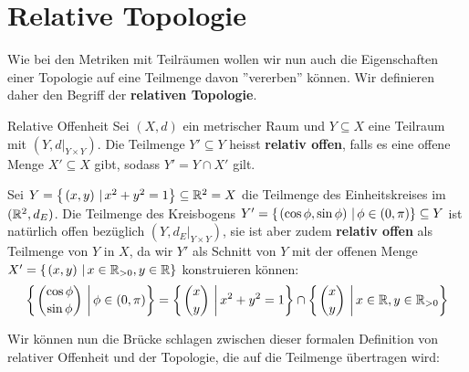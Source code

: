\section{Relative Topologie}
Wie bei den Metriken mit Teilräumen wollen wir nun auch die Eigenschaften einer Topologie auf eine Teilmenge davon ''vererben'' können. Wir definieren daher den Begriff der \textbf{relativen Topologie}.

\begin{definition}{Relative Offenheit}{}
Sei $(X,d)$ ein metrischer Raum und $Y \subseteq X$ eine Teilraum mit $(Y, d\vert_{Y\times Y})$. Die Teilmenge $Y' \subseteq Y$ heisst \textbf{relativ offen}, falls es eine offene Menge $X' \subseteq X$ gibt, sodass $Y' = Y \cap X'$ gilt.
\end{definition}

\begin{example}\label{ex_relative_offenheit}
Sei $Y = \left\{\left.(x,y) \ \right| x^2+y^2=1 \right\} \subseteq \mathbb{R}^2 = X$ die Teilmenge des Einheitskreises im $(\mathbb{R}^2, d_E)$. Die Teilmenge des Kreisbogens $Y' = \left\{\left.(\cos \phi, \sin \phi) \ \right| \phi \in (0, \pi) \right\} \subseteq Y$ ist natürlich offen bezüglich $(Y, d_E\vert_{Y\times Y})$, sie ist aber zudem \textbf{relativ offen} als Teilmenge von $Y$ in $X$, da wir $Y'$ als Schnitt von $Y$ mit der offenen Menge $X' = \left\{\left.(x,y) \ \right| x \in \mathbb{R}_{>0}, y \in \mathbb{R} \right\}$ konstruieren können:
$$\left\{\left.\binom{\cos \phi}{\sin \phi} \ \right| \phi \in (0, \pi) \right\} = \left\{\left.\binom{x}{y} \ \right| x^2+y^2=1 \right\} \cap \left\{\left.\binom{x}{y} \ \right| x \in \mathbb{R}, y \in \mathbb{R}_{>0} \right\}$$
\end{example}

Wir können nun die Brücke schlagen zwischen dieser formalen Definition von relativer Offenheit und der Topologie, die auf die Teilmenge übertragen wird:

